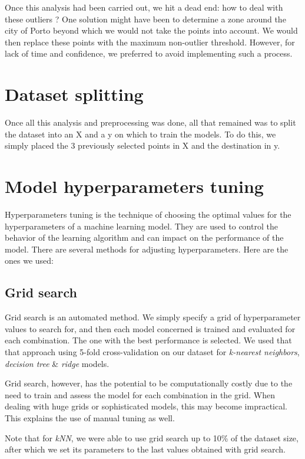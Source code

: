 \documentclass[12pt, titlepage]{article}
\begin{document}
Once this analysis had been carried out, we hit a dead end: how to deal with these outliers ? One solution might have been to determine a zone around the city of Porto beyond which we would not take the points into account. We would then replace these points with the maximum non-outlier threshold. However, for lack of time and confidence, we preferred to avoid implementing such a process.

\section{Dataset splitting}

Once all this analysis and preprocessing was done, all that remained was to split the dataset into an X and a y on which to train the models. To do this, we simply placed the 3 previously selected points in X and the destination in y.

\section{Model hyperparameters tuning}
Hyperparameters tuning is the technique of choosing the optimal values for the hyperparameters of a machine learning model. They are used to control the behavior of the learning algorithm and can impact on the performance of the model. There are several methods for adjusting hyperparameters. Here are the ones we used:

\subsection{Grid search}

Grid search is an automated method. We simply specify a grid of hyperparameter values to search for, and then each model concerned is trained and evaluated for each combination. The one with the best performance is selected. We used that that approach using 5-fold cross-validation on our dataset for \textit{k-nearest neighbors}, \textit{decision tree} \& \textit{ridge} models.

Grid search, however, has the potential to be computationally costly due to the need to train and assess the model for each combination in the grid. When dealing with huge grids or sophisticated models, this may become impractical. This explains the use of manual tuning as well.

Note that for \textit{kNN}, we were able to use grid search up to 10\% of the dataset size, after which we set its parameters to the last values obtained with grid search.
\end{document}
